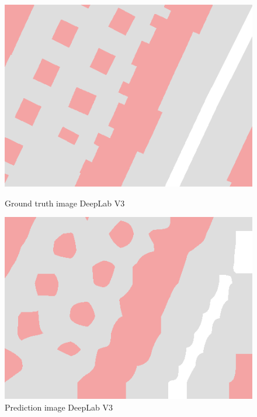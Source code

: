 \documentclass[]{IEEEtran}
\begin{document}
\begin{figure}[!hbt]
		\vspace{2.5cm}
		\begin{center}
			\begin{minipage}[t]{0.21\textwidth}
				\includegraphics[width=\columnwidth]{dl3_SAT01-00008_gt}
				\caption{Ground truth image DeepLab V3}
				\label{fig:dlv3_gt}
			\end{minipage}
		    \hspace{0.5cm}
			\begin{minipage}[t]{0.21\textwidth}
				\includegraphics[width=\columnwidth]{dl3_SAT01-00008_pred}
				\caption{Prediction image DeepLab V3}
				\label{fig:dlv3_pr}
			\end{minipage}
		\end{center}
	\end{figure}
\end{document}
